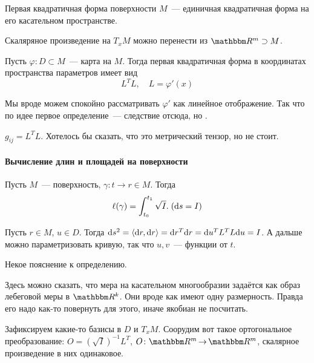 \documentclass[draft,timbord]{longnotes}
\begin{document}
\begin{defn}\label{defn:dg::tangentbndl::Ibetter}
  Первая квадратичная форма поверхности $M$~--- единичная 
  квадратичная форма на его касательном пространстве. 
\end{defn}

Скаляряное произведение на $T_x M$ можно перенести из $\R^m \supset M$. 

\begin{prop}\label{prop:dg::tangentbndl::Ipar}
  Пусть $\varphi \colon D \subset M$~--- карта на $M$. Тогда первая квадратичная форма в 
  координатах пространства параметров имеет вид 
  \[
    L^T L , \quad L = \varphi'(x)
  \]
\end{prop}

Мы вроде можем спокойно рассматривать $\varphi'$ как линейное отображение.
Так что по идее первое определение~--- следствие отсюда, но \quest.

\begin{defn}\label{defn:dg::tangentbndl::gram}
  $g_{ij} = L^T L$. Хотелось бы сказать, что это метрический тензор, но не стоит.
\end{defn}

\paragraph{Вычисление длин и площадей на поверхности}
\label{par:dg::area}

\begin{thrm}\label{thrm:dg::area::len}
  Пусть $M$~--- поверхность, $\gamma \colon t \to r \in M$.
  Тогда \[
    \ell(\gamma)= \displaystyle\int_{t_0}^{t_1} \sqrt I.\; (\mathrm{d} s = I)
  \]
\end{thrm}
\begin{tproof}
  Пусть $r \in M$, $u \in D$. Тогда
  $\mathrm{d} s^2 = \langle \mathrm{d} r, \mathrm{d} r \rangle = \mathrm{d} r ^T \mathrm{d} r = \mathrm{d} u^T L^T L \mathrm{d} u = I$.
  А дальше можно параметризовать кривую, так что $u,v$~--- функции от $t$. 
\end{tproof}


Некое пояснение к определению.

Здесь можно сказать, что  мера на касательном многообразии
задаётся как образ лебеговой меры в $\R^k$.
Они вроде как имеют одну размерность.
Правда его надо как-то повернуть для этого, иначе якобиан не посчитать.

Зафиксируем какие-то базисы в $D$ и $T_xM$.
Соорудим вот такое ортогональное преобразование: $O = \left(\sqrt{I}\right)^{-1} L^T$,
$O \colon \R^m \to \R^m$, скалярное произведение в них одинаковое.
\end{document}
